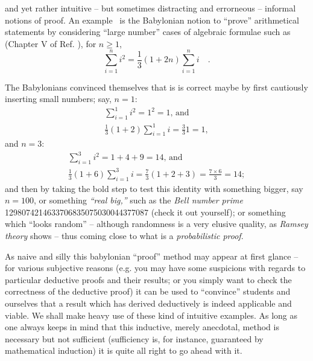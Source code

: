  and yet rather intuitive -- but sometimes distracting and errorneous -- informal notions of proof.
An example~\cite{baats1} is the Babylonian notion to ``prove'' arithmetical statements
by considering ``large number'' cases
of algebraic formulae such as  (Chapter V of Ref. \cite{neugeb}), for $n\ge 1$,
\begin{equation}
\sum_{i=1}^n i^2 = \frac{1}{3}\left(1+2n\right)\sum_{i=1}^n i \quad .
\label{2013-m-ch-intros-f1}
\end{equation}

The Babylonians convinced themselves that is is correct maybe by first cautiously inserting small numbers; say,  $n=1$:
\begin{equation*}
\begin{split}
\sum_{i=1}^1 i^2 = 1^2 = 1\text{, and}\\
\frac{1}{3}\left(1+2\right)\sum_{i=1}^1 i =\frac{3}{3} 1 = 1,
\end{split}
\end{equation*}
and $n=3$:
\begin{equation*}
\begin{split}
\sum_{i=1}^3 i^2 = 1+4+9=14
\text{, and}\\
\frac{1}{3}\left(1+6\right)\sum_{i=1}^3 i =\frac{7}{3}(1+2+3)=\frac{7\times 6}{3}=14;
\end{split}
\end{equation*}
and then by taking the bold step to test this identity with something bigger, say $n=100$, or something {\em ``real big,''}
such as the {\em Bell number prime} 1298074214633706835075030044377087 (check it out yourself);
or something which ``looks random'' -- although randomness is a very elusive quality, as {\em Ramsey theory}
shows --
thus coming close to what is a {\em probabilistic proof}.

As naive and silly this babylonian ``proof'' method may appear at first glance  -- for various subjective reasons
(e.g. you may have some suspicions with regards to particular deductive proofs and their results; or you simply want to check the correctness of the deductive proof)
it can be used to ``convince'' students and ourselves that
a result which has derived deductively is indeed applicable and viable.
We shall make heavy use of these kind of intuitive examples.
As long as one always keeps in mind that this inductive, merely anecdotal, method is necessary but not sufficient
(sufficiency is, for instance, guaranteed by mathematical induction) it is quite all right to go ahead with it.

